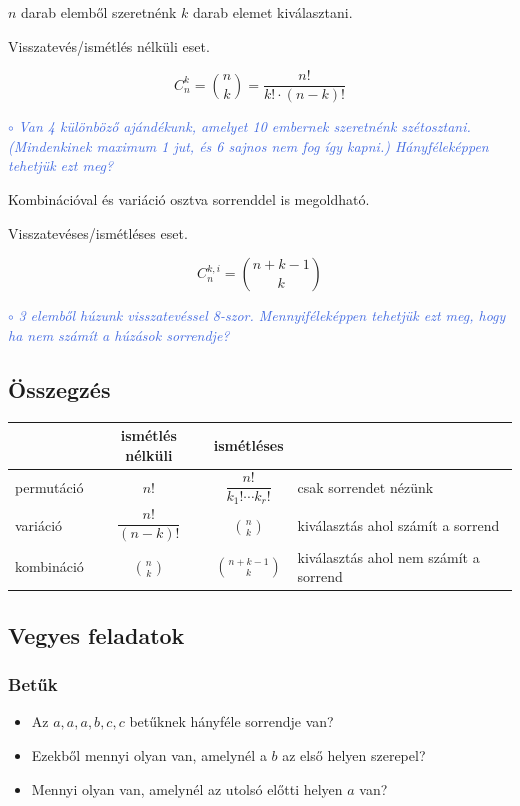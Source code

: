 \documentclass[a4paper]{article}
\newenvironment{task}[1]
{\noindent\textcolor{RoyalBlue}{$\circ$ \textit{#1}}

\smallskip

\color{Gray}

}{\bigskip}
\begin{document}
$n$ darab elemből szeretnénk $k$ darab elemet kiválasztani.

Visszatevés/ismétlés nélküli eset.

\[
\displaystyle C_{n}^{k} = \binom{n}{k} = \dfrac{n!}{k! \cdot (n - k)!}
\]

\begin{task}{Van 4 különböző ajándékunk, amelyet 10 embernek szeretnénk szétosztani. (Mindenkinek maximum 1 jut, és 6 sajnos nem fog így kapni.) Hányféleképpen tehetjük ezt meg?}
Kombinációval és variáció osztva sorrenddel is megoldható.
\end{task}

Visszatevéses/ismétléses eset.

\[
\displaystyle C_{n}^{k, i} = \binom{n + k - 1}{k}
\]

\begin{task}{3 elemből húzunk visszatevéssel 8-szor. Mennyiféleképpen tehetjük ezt meg, hogy ha nem számít a húzások sorrendje?}
\end{task}

\subsection*{Összegzés}

\begin{tabular}{l|c|c|l}
& ismétlés nélküli & ismétléses & \\
\hline
permutáció & $n!$ & $\dfrac{n!}{k_1! \cdots k_r!}$ & csak sorrendet nézünk \\
\hline
variáció & $\dfrac{n!}{(n - k)!}$ & $\displaystyle\binom{n}{k}$ & kiválasztás ahol számít a sorrend \\
\hline
kombináció & $\displaystyle\binom{n}{k}$ & $\displaystyle\binom{n + k - 1}{k}$ & kiválasztás ahol nem számít a sorrend \\
\hline
\end{tabular}

\subsection{Vegyes feladatok}

\subsubsection{Betűk}

\begin{itemize}
\item Az $a, a, a, b, c, c$ betűknek hányféle sorrendje van?
\item Ezekből mennyi olyan van, amelynél a $b$ az első helyen szerepel?
\item Mennyi olyan van, amelynél az utolsó előtti helyen $a$ van?
\end{itemize}
\end{document}
